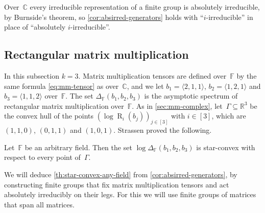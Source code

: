 \documentclass[11pt,letterpaper]{article}
\DeclareMathOperator{\tensorrank}{R}
\newcommand{\FF}{\mathbb{F}}
\newcommand{\RR}{\mathbb{R}}
\newcommand{\CC}{\mathbb{C}}
\begin{document}
Over~$\CC$ every irreducible representation of a finite group is absolutely irreducible, by Burnside's theorem, so \cref{cor:absirred-generators} holds with ``$i$-irreducible'' in place of ``absolutely $i$-irreducible''.

\subsection{Rectangular matrix multiplication}\label{sec:mm-any-field}

In this subsection $k = 3$. Matrix multiplication tensors are defined over~$\FF$ by the same formula \eqref{eq:mm-tensor} as over~$\CC$, and we let $b_1 = \langle 2,1,1 \rangle$, $b_2 = \langle 1,2,1 \rangle$ and $b_3 = \langle 1,1,2 \rangle$ over~$\FF$. The set $\Delta_\FF(b_1,b_2,b_3)$ is the asymptotic spectrum of rectangular matrix multiplication over~$\FF$. As in \cref{sec:mm-complex}, let~$\Gamma \subseteq \RR^3$ be the convex hull of the points $(\log \tensorrank_i(b_j))_{j \in [3]}$ with $i \in [3]$, which are $(1,1,0)$, $(0,1,1)$ and $(1,0,1)$. Strassen proved the following.

\begin{theorem}\label{th:star-convex-any-field}
Let~$\FF$ be an arbitrary field. Then the set $\log \Delta_\FF(b_1,b_2,b_3)$ is star-convex with respect to every point of~$\Gamma$.
\end{theorem}

We will deduce \cref{th:star-convex-any-field} from \cref{cor:absirred-generators}, by constructing finite groups that fix matrix multiplication tensors and act absolutely irreducibly on their legs. For this we will use finite groups of matrices that span all matrices.
\end{document}
